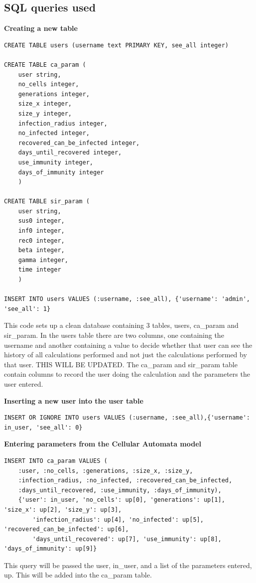 \documentclass[11pt, a4paper]{article}
\begin{document}
\subsection{SQL queries used}
\textbf{Creating a new table}
\begin{lstlisting}
CREATE TABLE users (username text PRIMARY KEY, see_all integer)

CREATE TABLE ca_param (
    user string,
    no_cells integer,
    generations integer,
    size_x integer,
    size_y integer,
    infection_radius integer,
    no_infected integer,
    recovered_can_be_infected integer,
    days_until_recovered integer,
    use_immunity integer,
    days_of_immunity integer    
    )

CREATE TABLE sir_param (
    user string,
    sus0 integer,
    inf0 integer,
    rec0 integer,
    beta integer,
    gamma integer,
    time integer
    )

INSERT INTO users VALUES (:username, :see_all), {'username': 'admin', 'see_all': 1}
\end{lstlisting}
This code sets up a clean database containing 3 tables, users, ca\_param and sir\_param. In the users table there are two columns, one containing the username and another containing a value to decide whether that user can see the history of all calculations performed and not just the calculations performed by that user. THIS WILL BE UPDATED. The ca\_param and sir\_param table contain columns to record the user doing the calculation and the parameters the user entered.

\textbf{Inserting a new user into the user table}
\begin{lstlisting}
INSERT OR IGNORE INTO users VALUES (:username, :see_all),{'username': in_user, 'see_all': 0}
\end{lstlisting}

\textbf{Entering parameters from the Cellular Automata model}
\begin{lstlisting}
INSERT INTO ca_param VALUES (
    :user, :no_cells, :generations, :size_x, :size_y,
    :infection_radius, :no_infected, :recovered_can_be_infected,
    :days_until_recovered, :use_immunity, :days_of_immunity),
    {'user': in_user, 'no_cells': up[0], 'generations': up[1], 'size_x': up[2], 'size_y': up[3],
        'infection_radius': up[4], 'no_infected': up[5], 'recovered_can_be_infected': up[6],
        'days_until_recovered': up[7], 'use_immunity': up[8], 'days_of_immunity': up[9]}
\end{lstlisting}
This query will be passed the user, in\_user, and a list of the parameters entered, up. This will be added into the ca\_param table.
\end{document}
